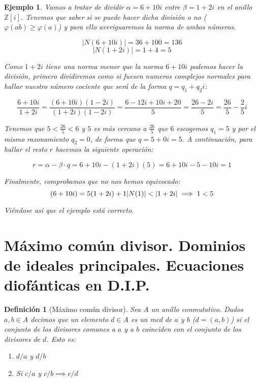 \documentclass[11pt, a4paper, titlepage]{article}
\newif\IfInSansMode
\providecommand{\ent}{\mathbb{Z}}
\providecommand{\abs}[1]{\lvert#1\rvert}
\theoremstyle{theorem-style}
\theoremstyle{definition-style}
\newtheorem{ndef}{Definición}[section]
\theoremstyle{remark-style}
\theoremstyle{example-style}
\newtheorem{ejemplo}{Ejemplo}[section]
\newenvironment{nlist}
{\begin{enumerate}
\renewcommand\labelenumi{(\emph{\roman{enumi})}}}
{\end{enumerate}}
\begin{document}
\begin{ejemplo}
Vamos a tratar de dividir $\alpha=6+10i$ entre $\beta=1+2i$ en el anillo $\ent[i]$. Tenemos que saber si se puede hacer dicha división o no ($\varphi(ab) \ge \varphi(a)$) y para ello averiguaremos la norma de ambos números.

$$\abs{N(6+10i)}=36+100=136$$
$$\abs{N(1+2i)}=1+4=5$$

Como $1+2i$ tiene una norma menor que la norma $6+10i$ podemos hacer la división, primero dividiremos como si fuesen numeros complejos normales para hallar nuestro número cociente que será de la forma $q=q_1+q_2i$:

\[
	\frac{6+10i}{1+2i}=\frac{(6+10i)(1-2i)}{(1+2i)(1-2i)}=\frac{6-12i+10i+20}{5}=\frac{26-2i}{5}=\frac{26}{5}-\frac{2}{5}i
\]

Tenemos que $5<\frac{26}{5}<6$ y $5$ es más cercano a $\frac{26}{5}$ que $6$ escogemos $q_1=5$ y por el mismo razonamiento $q_2=0$, de forma que $q=5+0i=5$. A continuación, para hallar el resto $r$ hacemos la siguiente operación:

\[
	r=\alpha-\beta \cdot q = 6+10i - (1+2i)(5)=6+10i-5-10i=1
\]

Finalmente, comprobamos que no nos hemos equivocado:
\[
	(6+10i)=5(1+2i)+1\\
	\abs{N(1)}<\abs{1+2i} \implies 1<5
\]

Viéndose así que el ejemplo está correcto.

\end{ejemplo}

\section{Máximo común divisor. Dominios de ideales principales. Ecuaciones diofánticas en D.I.P.}


\begin{ndef}[Máximo común divisor]

Sea $A$ un anillo conmutativo. Dados $a,b \in A$ decimos que un elemento $d\in A$ es un \textit{mcd} de $a$ y $b$ ($d=(a,b)$) si el conjunto de los divisores comunes a $a$ y a $b$ coinciden con el conjunto de los divisores de $d$. Esto es:

\begin{nlist}
	\item $d/a$ y $d/b$
	\item Si $c/a$ y $c/b \implies c/d$
\end{nlist}

\end{ndef}
\end{document}
